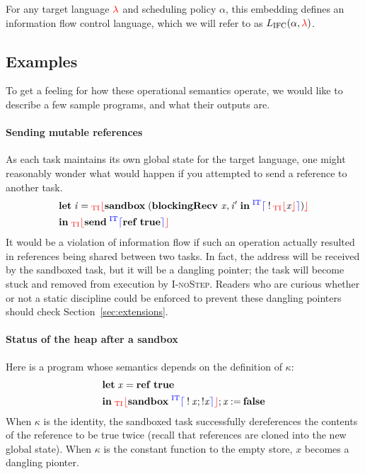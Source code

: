 \documentclass{sigplanconf}
\newcommand{\Varid}[1]{\mathit{#1}}
\newcommand{\Red}[1]{{\color{red} #1}}
\begin{document}
For any target language \ensuremath{\Red{\lambda}} and scheduling policy \ensuremath{\alpha}, this
embedding defines an information flow control language, which we will
refer to as \ensuremath{L_\text{IFC}(\alpha,\Red{\lambda})}.

\subsection{Examples}

To get a feeling for how these operational semantics operate, we
would like to
describe a few sample programs, and what their outputs are.

\paragraph{Sending mutable references}  As each task maintains its own
global state for the target language, one might reasonably wonder what would
happen if you attempted to send a reference to another task.
\begin{align*}
    & \ensuremath{\mathbf{let}\;\Varid{i}\mathrel{=}\tar{_{\textrm{TI}}\lfloor}\mathbf{sandbox}\;(\mathbf{blockingRecv}\ \Varid{x},\Varid{i'}\;\mathbf{in}\;\ifc{^{\textrm{IT}}\lceil}\mathbin{!}\tar{_{\textrm{TI}}\lfloor}\Varid{x}\tar{\rfloor}\ifc{\rceil})\tar{\rfloor}} \\
    & \ensuremath{\mathbf{in}\;\tar{_{\textrm{TI}}\lfloor}\mathbf{send}\;\ifc{^{\textrm{IT}}\lceil}\mathbf{ref}\;\mathbf{true}\ifc{\rceil}\tar{\rfloor}}
\end{align*}
It would be a violation of information flow if such an operation actually
resulted in references being shared between two tasks.  In fact, the address
will be received by the sandboxed task, but it will be a dangling pointer; the
task will become stuck and removed from execution by \textsc{I-noStep}.  Readers
who are curious whether or not a static discipline could be enforced to
prevent these dangling pointers should check Section~\ref{sec:extensions}.

\paragraph{Status of the heap after a sandbox}  Here is a program whose
semantics depends on the definition of \ensuremath{\kappa}:
\begin{align*}
    & \ensuremath{\mathbf{let}\;\Varid{x}\mathrel{=}\mathbf{ref}\;\mathbf{true}} \\
    & \ensuremath{\mathbf{in}\;\tar{_{\textrm{TI}}\lfloor}\mathbf{sandbox}\;\ifc{^{\textrm{IT}}\lceil}\mathbin{!}\Varid{x};\mathbin{!}\Varid{x}\ifc{\rceil}\tar{\rfloor};\Varid{x}\mathbin{:=}\mathbf{false}}
\end{align*}
When \ensuremath{\kappa} is the identity, the sandboxed task successfully dereferences
the contents of the reference to be true twice (recall that references
are cloned into the new global state).  When $\kappa$ is the constant function
to the empty store, $x$ becomes a dangling pionter.
\end{document}
